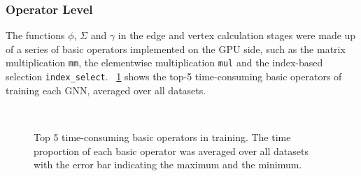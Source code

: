 \subsubsection{Operator Level}
\label{sec:time_breakdown_analysis_operator_level}

The functions $\phi$, $\Sigma$ and $\gamma$ in the edge and vertex calculation stages were made up of a series of basic operators implemented on the GPU side, such as the matrix multiplication \texttt{mm}, the elementwise multiplication \texttt{mul} and the index-based selection \texttt{index\_select}.
%
\figurename~\ref{fig:exp_top_basic_ops} shows the top-5 time-consuming basic operators of training each GNN, averaged over all datasets.

\begin{figure}[H]
    \centering
    \\
    \caption{Top 5 time-consuming basic operators in training. The time proportion of each basic operator was averaged over all datasets with the error bar indicating the maximum and the minimum.}
    \label{fig:exp_top_basic_ops}
\end{figure}


